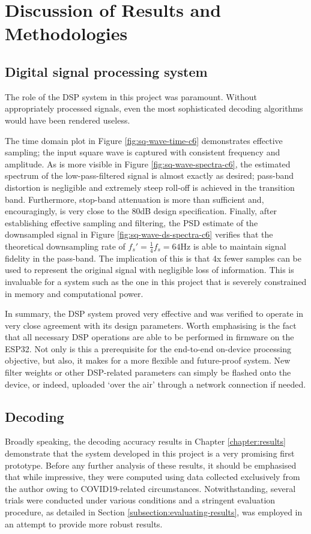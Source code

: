 \chapter{Discussion of Results and Methodologies}
\label{chapter:discussion}

\graphicspath{ {report/C7 Discussion/assets/} } 

\section{Digital signal processing system}
The role of the DSP system in this project was paramount. Without appropriately processed signals, even the most sophisticated decoding algorithms would have been rendered useless. 

The time domain plot in Figure \ref{fig:sq-wave-time-c6} demonstrates effective sampling; the input square wave is captured with consistent frequency and amplitude. As is more visible in Figure \ref{fig:sq-wave-spectra-c6}, the estimated spectrum of the low-pass-filtered signal is almost exactly as desired; pass-band distortion is negligible and extremely steep roll-off is achieved in the transition band. Furthermore, stop-band attenuation is more than sufficient and, encouragingly, is very close to the 80dB design specification. Finally, after establishing effective sampling and filtering, the PSD estimate of the downsampled signal in Figure \ref{fig:sq-wave-ds-spectra-c6} verifies that the theoretical downsampling rate of $f_s'=\frac{1}{4}f_s = 64$Hz is able to maintain signal fidelity in the pass-band. The implication of this is that 4x fewer samples can be used to represent the original signal with negligible loss of information. This is invaluable for a system such as the one in this project that is severely constrained in memory and computational power.

In summary, the DSP system proved very effective and was verified to operate in very close agreement with its design parameters. Worth emphasising is the fact that all necessary DSP operations are able to be performed in firmware on the ESP32. Not only is this a prerequisite for the end-to-end on-device processing objective, but also, it makes for a more flexible and future-proof system. New filter weights or other DSP-related parameters can simply be flashed onto the device, or indeed, uploaded `over the air' through a network connection if needed.

\section{Decoding}
Broadly speaking, the decoding accuracy results in Chapter \ref{chapter:results} demonstrate that the system developed in this project is a very promising first prototype. Before any further analysis of these results, it should be emphasised that while impressive, they were computed using data collected exclusively from the author owing to COVID19-related circumstances. Notwithstanding, several trials were conducted under various conditions and a stringent evaluation procedure, as detailed in Section \ref{subsection:evaluating-results}, was employed in an attempt to provide more robust results. 

